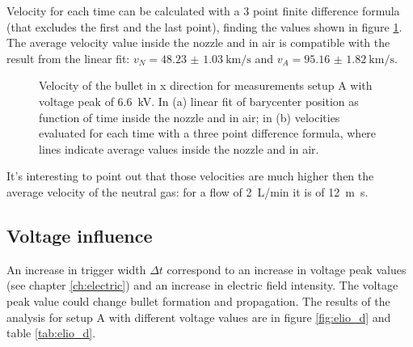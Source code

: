 Velocity for each time can be calculated with a 3 point finite difference formula (that excludes the first and the last point), finding the values shown in figure \ref{fig:elio_d035_vx}. The average velocity value inside the nozzle and in air is compatible with the result from the linear fit: $v_{N} = \SI{48.23(103)}{\kilo\meter/\second}$ and $v_{A} = \SI{95.16(182)}{\kilo\meter/\second}$.
\begin{figure}
 \centering
 \hfill
 \caption{Velocity of the bullet in x direction for measurements setup A with voltage peak of \SI{6.6}{\kilo\volt}. In (a) linear fit of barycenter position as function of time inside the nozzle and in air; in (b) velocities evaluated for each time with a three point difference formula, where lines indicate average values inside the nozzle and in air.}
 \label{fig:elio_d035_vx}
\end{figure}

It's interesting to point out that those velocities are much higher then the average velocity of the neutral gas: for a flow of \SI{2}{\liter/\minute} it is of \SI{12}{\meter\second}.


\subsection{Voltage influence}
An increase in trigger width $\Delta t$ correspond to an increase in voltage peak values (see chapter \ref{ch:electric}) and an increase in electric field intensity. The voltage peak value could change bullet formation and propagation. The results of the analysis for setup A with different voltage values are in figure \ref{fig:elio_d} and table \ref{tab:elio_d}.

